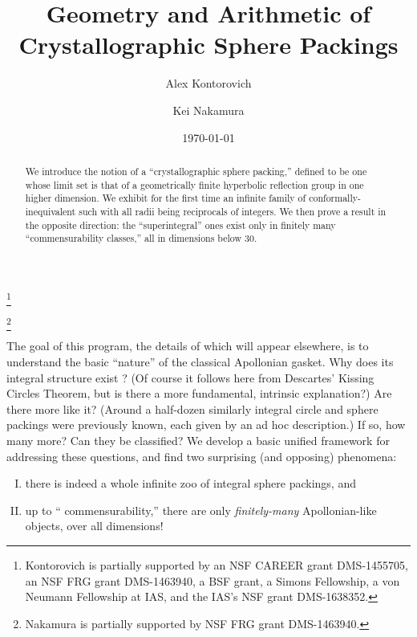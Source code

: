 \documentclass[12pt,reqno]{amsart}
\begin{document}

\author{Alex Kontorovich}
\thanks{Kontorovich is partially supported by
an NSF CAREER grant DMS-1455705, an NSF FRG grant DMS-1463940,  a BSF grant, a Simons Fellowship,  a von Neumann Fellowship at IAS, and the IAS's NSF grant DMS-1638352.}
\address{Department of Mathematics, Rutgers University, New Brunswick, NJ, and School of Mathematics, Institute for Advanced Study, Princeton, NJ}
\author{Kei Nakamura}
\thanks{Nakamura is partially supported by
 NSF FRG grant DMS-1463940.}
\address{Department of Mathematics, Rutgers University, New Brunswick, NJ}


\title
[Geometry %
and Arithmetic of
Crystallographic
Sphere Packings]
{%
Geometry %
and Arithmetic of\\ %
Crystallographic
Sphere Packings}


\begin{abstract}
We introduce the notion of a ``crystallographic sphere packing,'' defined to be one whose limit set is that of a geometrically finite hyperbolic reflection group in one higher dimension.
We  exhibit for the first time an infinite family of conformally-inequivalent such
with all radii being reciprocals of integers.
We then prove a result in the opposite direction:  the ``superintegral'' ones exist only in finitely many ``commensurability classes,'' all in dimensions below $30$.
\end{abstract}
\date{\today}
\maketitle






The
goal  of this program, the details of which will appear elsewhere, 
is to understand the basic ``nature'' of the classical Apollonian gasket. 
Why does its integral structure exist%
? (Of course it follows %
here
from Descartes' Kissing Circles Theorem, but is there  
a more fundamental, intrinsic explanation?) Are there more like it? (Around a half-dozen similarly integral circle and sphere packings were previously known, each given by an ad hoc description.)  If so, how many more? Can they be classified?
We develop a basic unified framework for addressing these questions, and find two surprising %
(and %
opposing)
phenomena:
\begin{enumerate}[(I)]
\item\label{I}  there is indeed a whole infinite zoo of integral sphere packings, and 
\item\label{II} up to ``%
commensurability,'' there are only {\it finitely-many} Apollonian-like objects, over all dimensions! 
\end{enumerate}
\end{document}
